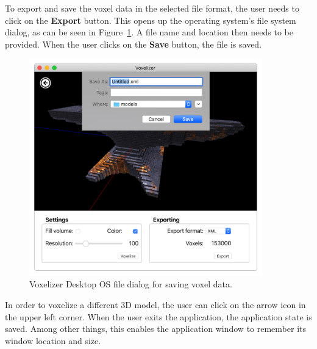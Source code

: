 To export and save the voxel data in the selected file format, the user needs to click on the \textbf{Export} button. This opens up the operating system's file system dialog, as can be seen in Figure~\ref{fig:voxelizer-desktop-gui-export}. A file name and location then needs to be provided. When the user clicks on the \textbf{Save} button, the file is saved.
\begin{figure}[htp]
    \centering
    \includegraphics[width=0.9\textwidth]{sections/result/figures/voxelizer-desktop-gui-export.png}
    \caption{Voxelizer Desktop OS file dialog for saving voxel data.}
    \label{fig:voxelizer-desktop-gui-export}
\end{figure}

In order to voxelize a different 3D model, the user can click on the arrow icon in the upper left corner. When the user exits the application, the application state is saved. Among other things, this enables the application window to remember its window location and size.

